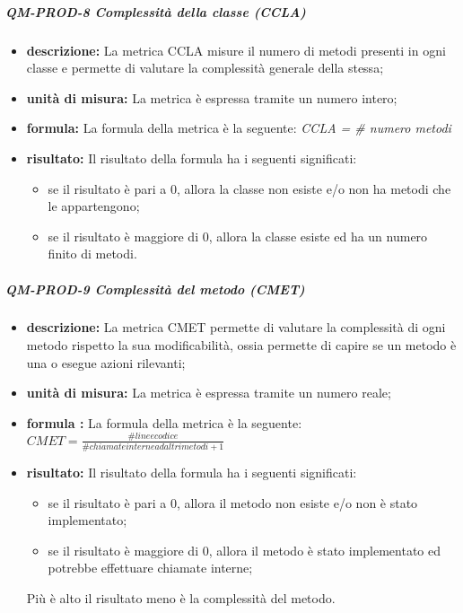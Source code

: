 			\subparagraph{QM-PROD-8 Complessità della classe (CCLA)}
			\begin{itemize}
      			\item \textbf{descrizione: }
					La metrica CCLA misure il numero di metodi presenti in ogni classe e permette di valutare la complessità generale della stessa;
				\item \textbf{unità di misura: }
					La metrica è espressa tramite un numero intero;
				\item \textbf{formula: }
					La formula della metrica è la seguente:
					\textit{CCLA = \# numero metodi}
				\item \textbf{risultato: }
					Il risultato della formula ha i seguenti significati:
					\begin{itemize}
						\item se il risultato è pari a 0, allora la classe non esiste e/o non ha metodi che le appartengono;
						\item se il risultato è maggiore di 0, allora la classe esiste ed ha un numero finito di metodi.
					\end{itemize}
			\end{itemize}
			\subparagraph{QM-PROD-9 Complessità del metodo (CMET)}
			\begin{itemize}
      			\item \textbf{descrizione: }
					La metrica CMET permette di valutare la complessità di ogni metodo rispetto la sua modificabilità, ossia permette di capire se un metodo è una  o esegue azioni rilevanti;
				\item \textbf{unità di misura: }
					La metrica è espressa tramite un numero reale;
				\item \textbf{formula :}
					La formula della metrica è la seguente:
					\(
						CMET = \frac{\# linee codice}{\# chiamate interne ad altri metodi+1}
					\)
				\item \textbf{risultato: }
					Il risultato della formula ha i seguenti significati:
					\begin{itemize}
						\item se il risultato è pari a 0, allora il metodo non esiste e/o non è stato implementato;
						\item se il risultato è maggiore di 0, allora il metodo è stato implementato ed potrebbe effettuare chiamate interne;
					\end{itemize}
					Più è alto il risultato meno è la complessità del metodo.
			\end{itemize}


